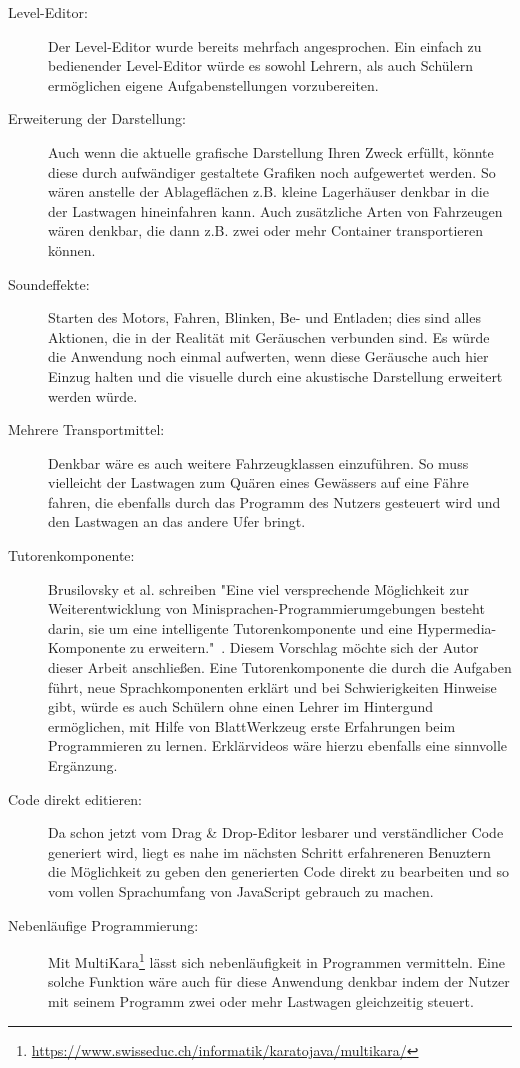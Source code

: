 \begin{description}
  \item[Level-Editor:] Der Level-Editor wurde bereits mehrfach angesprochen. Ein einfach zu bedienender Level-Editor würde es sowohl Lehrern, als auch Schülern ermöglichen eigene Aufgabenstellungen vorzubereiten.
  \item[Erweiterung der Darstellung:] Auch wenn die aktuelle grafische Darstellung Ihren Zweck erfüllt, könnte diese durch aufwändiger gestaltete Grafiken noch aufgewertet werden. So wären anstelle der Ablageflächen z.B. kleine Lagerhäuser denkbar in die der Lastwagen hineinfahren kann. Auch zusätzliche Arten von Fahrzeugen wären denkbar, die dann z.B. zwei oder mehr Container transportieren können.
  \item[Soundeffekte:] Starten des Motors, Fahren, Blinken, Be- und Entladen; dies sind alles Aktionen, die in der Realität mit Geräuschen verbunden sind. Es würde die Anwendung noch einmal aufwerten, wenn diese Geräusche auch hier Einzug halten und die visuelle durch eine akustische Darstellung erweitert werden würde.
  \item[Mehrere Transportmittel:] Denkbar wäre es auch weitere Fahrzeugklassen einzuführen. So muss vielleicht der Lastwagen zum Quären eines Gewässers auf eine Fähre fahren, die ebenfalls durch das Programm des Nutzers gesteuert wird und den Lastwagen an das andere Ufer bringt.
  \item[Tutorenkomponente:] Brusilovsky et al. schreiben "Eine viel versprechende Möglichkeit zur Weiterentwicklung von Minisprachen-Programmierumgebungen besteht darin, sie um eine intelligente Tutorenkomponente und eine Hypermedia-Komponente zu erweitern."~\cite[80]{brusilovsky1997}. Diesem Vorschlag möchte sich der Autor dieser Arbeit anschließen. Eine Tutorenkomponente die durch die Aufgaben führt, neue Sprachkomponenten erklärt und bei Schwierigkeiten Hinweise gibt, würde es auch Schülern ohne einen Lehrer im Hintergund ermöglichen, mit Hilfe von BlattWerkzeug erste Erfahrungen beim Programmieren zu lernen. Erklärvideos wäre hierzu ebenfalls eine sinnvolle Ergänzung.
  \item[Code direkt editieren:] Da schon jetzt vom Drag \& Drop-Editor lesbarer und verständlicher Code generiert wird, liegt es nahe im nächsten Schritt erfahreneren Benuztern die Möglichkeit zu geben den generierten Code direkt zu bearbeiten und so vom vollen Sprachumfang von JavaScript gebrauch zu machen.
  \item[Nebenläufige Programmierung:] Mit MultiKara\footnote{\url{https://www.swisseduc.ch/informatik/karatojava/multikara/}} lässt sich nebenläufigkeit in Programmen vermitteln. Eine solche Funktion wäre auch für diese Anwendung denkbar indem der Nutzer mit seinem Programm zwei oder mehr Lastwagen gleichzeitig steuert.
\end{description}
